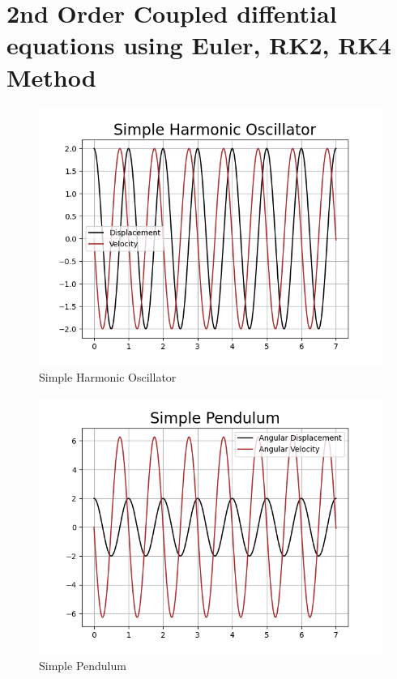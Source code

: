\documentclass{article}
\begin{document}
\section{2nd Order Coupled diffential equations using Euler, RK2, RK4 Method}


\clearpage
\begin{figure}[h]
    \centering
    \includegraphics[width=15cm,height=13cm \textwidth]{2nd_order_diff_using_rk2/Figure_1.png}
\caption{Simple Harmonic Oscillator}
\end{figure}
\begin{figure}[h]
    \centering
    \includegraphics[width=15cm,height=13cm \textwidth]{2nd_order_diff_using_rk2/Figure_3.png}
\caption{Simple Pendulum}
\end{figure}
\end{document}
